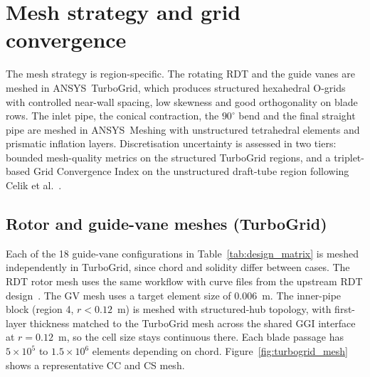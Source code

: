 \section{Mesh strategy and grid convergence}
\label{sec:methods_mesh}

The mesh strategy is region-specific. The rotating RDT and the guide vanes are meshed in ANSYS~TurboGrid, which produces structured hexahedral O-grids with controlled near-wall spacing, low skewness and good orthogonality on blade rows. The inlet pipe, the conical contraction, the $90^\circ$ bend and the final straight pipe are meshed in ANSYS~Meshing with unstructured tetrahedral elements and prismatic inflation layers. Discretisation uncertainty is assessed in two tiers: bounded mesh-quality metrics on the structured TurboGrid regions, and a triplet-based Grid Convergence Index on the unstructured draft-tube region following Celik et al.~\cite{Celik2008}.

\subsection{Rotor and guide-vane meshes (TurboGrid)}
\label{sec:turbogrid_quality}

Each of the 18 guide-vane configurations in Table~\ref{tab:design_matrix} is meshed independently in TurboGrid, since chord and solidity differ between cases. The RDT rotor mesh uses the same workflow with curve files from the upstream RDT design~\cite{DjupeslandTrivedi2025}. The GV mesh uses a target element size of $0.006$~m. The inner-pipe block (region 4, $r < 0.12$~m) is meshed with structured-hub topology, with first-layer thickness matched to the TurboGrid mesh across the shared GGI interface at $r = 0.12$~m, so the cell size stays continuous there. Each blade passage has $5\times10^{5}$ to $1.5\times10^{6}$ elements depending on chord. Figure~\ref{fig:turbogrid_mesh} shows a representative CC and CS mesh.

